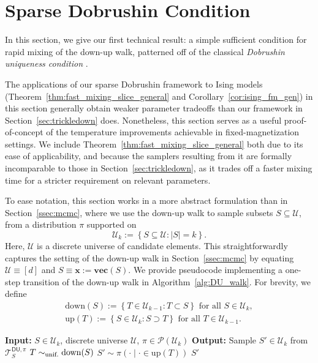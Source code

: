 \documentclass[11pt]{article}
\newcommand{\defeq}{:=}
\newcommand{\1}{\mathbf{1}}
\newcommand{\0}{\mathbf{0}}
\newcommand{\Brace}[1]{\left\{#1\right\}}
\newcommand{\simu}{\sim_{\textup{unif.}}}
\newcommand{\down}{\mathrm{down}}
\newcommand{\up}{\mathrm{up}}
\newcommand{\vx}{{\mathbf{x}}}
\newcommand{\calP}{{\mathcal{P}}}
\newcommand{\calT}{{\mathcal{T}}}
\newcommand{\calU}{{\mathcal{U}}}
\newcommand{\DU}{\mathsf{DU}}
\newcommand{\TDU}[1]{\calT^{\mathsf{DU}, #1}}
\newcommand{\vvec}{\mathbf{vec}}
\begin{document}
\section{Sparse Dobrushin Condition}\label{sec:dobrushin}

In this section, we give our first technical result: a simple sufficient condition for rapid mixing of the down-up walk, patterned off of the classical \emph{Dobrushin uniqueness condition} \cite{Dobruschin68, Wu06}.

The applications of our sparse Dobrushin framework to Ising models (Theorem~\ref{thm:fast_mixing_slice_general} and Corollary~\ref{cor:ising_fm_gen}) in this section generally obtain weaker parameter tradeoffs than our framework in Section~\ref{sec:trickledown} does. Nonetheless, this section serves as a useful proof-of-concept of the temperature improvements achievable in fixed-magnetization settings. We include Theorem~\ref{thm:fast_mixing_slice_general} both due to its ease of applicability, and because the samplers resulting from it are formally incomparable to those in Section~\ref{sec:trickledown}, as it trades off a faster mixing time for a stricter requirement on relevant parameters.

To ease notation, this section works in a more abstract formulation than in Section~\ref{ssec:mcmc}, where we use the down-up walk to sample subsets $S \subseteq \calU$, from a distribution $\pi$ supported on
\begin{equation}\label{eq:Uk_def}\calU_k \defeq \Brace{S \subseteq \calU: |S| = k}.\end{equation}
Here, $\calU$ is a discrete universe of candidate elements. This straightforwardly captures the setting of the down-up walk in Section~\ref{ssec:mcmc} by equating $\calU \equiv [d]$ and $S \equiv \vx \defeq \vvec(S)$. We provide pseudocode implementing a one-step transition of the down-up walk in Algorithm~\ref{alg:DU_walk}. For brevity, we define
\begin{gather*}
\down(S) \defeq \Brace{T \in \calU_{k - 1}: T \subset S} \text{ for all } S \in \calU_k, \\ 
\up(T) \defeq \Brace{S \in \calU_k: S \supset T} \text{ for all } T \in \calU_{k - 1}.
\end{gather*}

\begin{algorithm}[ht]
\DontPrintSemicolon
    \caption{$\DU(S, \calU, \pi)$}
    \label{alg:DU_walk}
    \textbf{Input:} $S \in \calU_k$, discrete universe $\calU$, $\pi \in \calP(\calU_k)$ \;
    \textbf{Output:} Sample $S' \in \calU_k$ from $\TDU{\pi}_S$\;
    $T \simu \down(S)$ \;\label{line:downstep}
    $S' \sim \pi(\cdot \mid \cdot \in \up(T))$\;\label{line:upstep}
    \Return $S'$
\end{algorithm}
\end{document}
